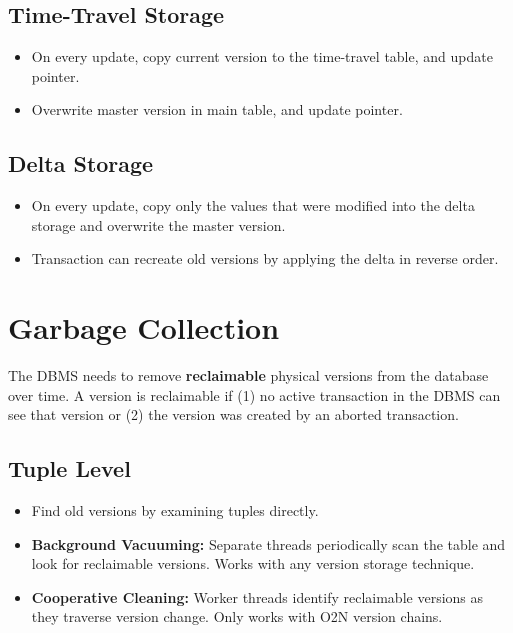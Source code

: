 \documentclass[11pt]{article}
\begin{document}
\subsection*{Time-Travel Storage}
\begin{itemize}
    \item
    On every update, copy current version to the time-travel table, and update pointer.
    
    \item
    Overwrite master version in main table, and update pointer.
\end{itemize}

\subsection*{Delta Storage}
\begin{itemize}
    \item
    On every update, copy only the values that were modified into the delta storage and 
    overwrite the master version.
    
    \item
    Transaction can recreate old versions by applying the delta in reverse order.
\end{itemize}

\section{Garbage Collection}
The DBMS needs to remove \textbf{reclaimable} physical versions from the database over 
time. A version is reclaimable if (1) no active transaction in the DBMS can see that version or 
(2) the version was created by an aborted transaction.

\subsection*{Tuple Level}
\begin{itemize}
    \item
    Find old versions by examining tuples directly.
    
    \item \textbf{Background Vacuuming:}
    Separate threads periodically scan the table and look for 
    reclaimable versions. Works with any version storage technique.
    
    \item \textbf{Cooperative Cleaning:}
    Worker threads identify reclaimable versions as they 
    traverse version change. Only works with O2N version chains.
\end{itemize}
\end{document}
